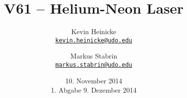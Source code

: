 



\title{%
    V61 -- Helium-Neon Laser
}
\author{%
    Kevin Heinicke\\
    \texttt{\href{mailto:kevin.heinicke@udo.edu}{kevin.heinicke@udo.edu}}
    \and
    Markus Stabrin\\
    \texttt{\href{mailto:markus.stabrin@udo.edu}{markus.stabrin@udo.edu}}
}
\date{%
    10. November 2014\\
    {\small 1. Abgabe} 9. Dezember 2014
}

    \maketitle%
    \tableofcontents
    \newpage

    
    
    
    \printbibliography

